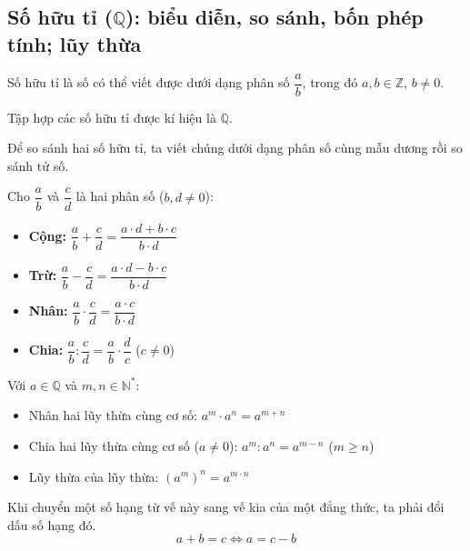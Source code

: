 \documentclass[12pt,a4paper]{article}
\begin{document}
\subsection{Số hữu tỉ ($\mathbb{Q}$): biểu diễn, so sánh, bốn phép tính; lũy thừa}

\begin{dinhnghia}
Số hữu tỉ là số có thể viết được dưới dạng phân số $\dfrac{a}{b}$, trong đó $a, b \in \mathbb{Z}$, $b \neq 0$.

Tập hợp các số hữu tỉ được kí hiệu là $\mathbb{Q}$.
\end{dinhnghia}

\begin{tinhchat}[title={So sánh hai số hữu tỉ}]
Để so sánh hai số hữu tỉ, ta viết chúng dưới dạng phân số cùng mẫu dương rồi so sánh tử số.
\end{tinhchat}

\begin{congthuc}[title={Bốn phép tính với số hữu tỉ}]
Cho $\dfrac{a}{b}$ và $\dfrac{c}{d}$ là hai phân số ($b, d \neq 0$):
\begin{itemize}
  \item \textbf{Cộng:} $\dfrac{a}{b} + \dfrac{c}{d} = \dfrac{a \cdot d + b \cdot c}{b \cdot d}$
  \item \textbf{Trừ:} $\dfrac{a}{b} - \dfrac{c}{d} = \dfrac{a \cdot d - b \cdot c}{b \cdot d}$
  \item \textbf{Nhân:} $\dfrac{a}{b} \cdot \dfrac{c}{d} = \dfrac{a \cdot c}{b \cdot d}$
  \item \textbf{Chia:} $\dfrac{a}{b} : \dfrac{c}{d} = \dfrac{a}{b} \cdot \dfrac{d}{c}$ \quad ($c \neq 0$)
\end{itemize}
\end{congthuc}

\begin{congthuc}[title={Lũy thừa}]
Với $a \in \mathbb{Q}$ và $m, n \in \mathbb{N}^*$:
\begin{itemize}
  \item Nhân hai lũy thừa cùng cơ số: $a^m \cdot a^n = a^{m+n}$
  \item Chia hai lũy thừa cùng cơ số ($a \neq 0$): $a^m : a^n = a^{m-n}$ \quad ($m \geq n$)
  \item Lũy thừa của lũy thừa: $(a^m)^n = a^{m \cdot n}$
\end{itemize}
\end{congthuc}

\begin{tinhchat}[title={Quy tắc chuyển vế}]
Khi chuyển một số hạng từ vế này sang vế kia của một đẳng thức, ta phải đổi dấu số hạng đó.
\[
  a + b = c \iff a = c - b
\]
\end{tinhchat}
\end{document}
